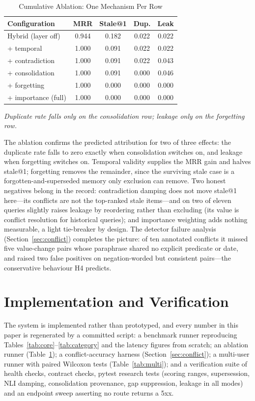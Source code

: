 \documentclass[conference]{IEEEtran}
\begin{document}
\begin{table}[htbp]
\caption{Cumulative Ablation: One Mechanism Per Row}
\label{tab:ablation}
\centering
\scriptsize
\begin{tabular}{|l|c|c|c|c|}
\hline
\textbf{Configuration} & \textbf{MRR} & \textbf{Stale@1} & \textbf{Dup.} & \textbf{Leak} \\
\hline
Hybrid (layer off) & 0.944 & 0.182 & 0.022 & 0.022 \\
\hline
+ temporal & 1.000 & 0.091 & 0.022 & 0.022 \\
\hline
+ contradiction & 1.000 & 0.091 & 0.022 & 0.043 \\
\hline
+ consolidation & 1.000 & 0.091 & 0.000 & 0.046 \\
\hline
+ forgetting & 1.000 & 0.000 & 0.000 & 0.000 \\
\hline
+ importance (full) & 1.000 & 0.000 & 0.000 & 0.000 \\
\hline
\end{tabular}
\vspace{0.5mm}

{\scriptsize\itshape Duplicate rate falls only on the consolidation row; leakage only on the forgetting row.}
\end{table}

The ablation confirms the predicted attribution for two of three effects: the duplicate rate falls to zero exactly when consolidation switches on, and leakage when forgetting switches on. Temporal validity supplies the MRR gain and halves stale@1; forgetting removes the remainder, since the surviving stale case is a forgotten-and-superseded memory only exclusion can remove. Two honest negatives belong in the record: contradiction damping does not move stale@1 here---its conflicts are not the top-ranked stale items---and on two of eleven queries slightly raises leakage by reordering rather than excluding (its value is conflict resolution for historical queries); and importance weighting adds nothing measurable, a light tie-breaker by design. The detector failure analysis (Section~\ref{sec:conflict}) completes the picture: of ten annotated conflicts it missed five value-change pairs whose paraphrase shared no explicit predicate or date, and raised two false positives on negation-worded but consistent pairs---the conservative behaviour H4 predicts.

\section{Implementation and Verification}
\label{sec:verify}
The system is implemented rather than prototyped, and every number in this paper is regenerated by a committed script: a benchmark runner reproducing Tables~\ref{tab:core}--\ref{tab:category} and the latency figures from scratch; an ablation runner (Table~\ref{tab:ablation}); a conflict-accuracy harness (Section~\ref{sec:conflict}); a multi-user runner with paired Wilcoxon tests (Table~\ref{tab:multi}); and a verification suite of health checks, contract checks, pytest research tests (scoring ranges, supersession, NLI damping, consolidation provenance, gap suppression, leakage in all modes) and an endpoint sweep asserting no route returns a 5xx.
\end{document}

